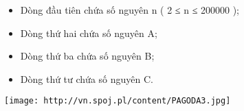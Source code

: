 \begin{itemize}
	\item Dòng đầu tiên chứa số nguyên n ( 2 ≤ n ≤ 200000 );
	\item Dòng thứ hai chứa số nguyên A;
	\item Dòng thứ ba chứa số nguyên B;
	\item Dòng thứ tư chứa số nguyên C.
\end{itemize}


\texttt{[image: http://vn.spoj.pl/content/PAGODA3.jpg]}

\